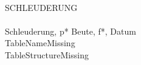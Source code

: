 \documentclass[12pt,a4paper]{scrartcl}
\newcommand{\DBTable} [2]
{ %
%
\ifx \\#1\\
	\newcommand{\tabname}{TableNameMissing}
\else
	\newcommand {\tabname} { #1 } 
\fi
%
\ifx \\#2\\
	\newcommand{\tabstruct}{TableStructureMissing}
\else
	\newcommand{\tabstruct}{#2}
\fi
\tabname   \\  \tabstruct 




} %
\begin{document}
\DBTable{SCHLEUDERUNG}{Schleuderung, p* Beute, f*, Datum}

\end{document}
